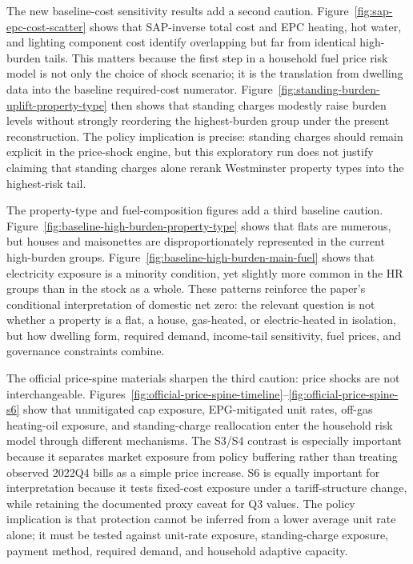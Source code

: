 The new baseline-cost sensitivity results add a second caution. Figure~\ref{fig:sap-epc-cost-scatter} shows that SAP-inverse total cost and EPC heating, hot water, and lighting component cost identify overlapping but far from identical high-burden tails. This matters because the first step in a household fuel price risk model is not only the choice of shock scenario; it is the translation from dwelling data into the baseline required-cost numerator. Figure~\ref{fig:standing-burden-uplift-property-type} then shows that standing charges modestly raise burden levels without strongly reordering the highest-burden group under the present reconstruction. The policy implication is precise: standing charges should remain explicit in the price-shock engine, but this exploratory run does not justify claiming that standing charges alone rerank Westminster property types into the highest-risk tail.

The property-type and fuel-composition figures add a third baseline caution. Figure~\ref{fig:baseline-high-burden-property-type} shows that flats are numerous, but houses and maisonettes are disproportionately represented in the current high-burden groups. Figure~\ref{fig:baseline-high-burden-main-fuel} shows that electricity exposure is a minority condition, yet slightly more common in the HR groups than in the stock as a whole. These patterns reinforce the paper's conditional interpretation of domestic net zero: the relevant question is not whether a property is a flat, a house, gas-heated, or electric-heated in isolation, but how dwelling form, required demand, income-tail sensitivity, fuel prices, and governance constraints combine.

The official price-spine materials sharpen the third caution: price shocks are not interchangeable. Figures~\ref{fig:official-price-spine-timeline}--\ref{fig:official-price-spine-s6} show that unmitigated cap exposure, EPG-mitigated unit rates, off-gas heating-oil exposure, and standing-charge reallocation enter the household risk model through different mechanisms. The S3/S4 contrast is especially important because it separates market exposure from policy buffering rather than treating observed 2022Q4 bills as a simple price increase. S6 is equally important for interpretation because it tests fixed-cost exposure under a tariff-structure change, while retaining the documented proxy caveat for Q3 values. The policy implication is that protection cannot be inferred from a lower average unit rate alone; it must be tested against unit-rate exposure, standing-charge exposure, payment method, required demand, and household adaptive capacity.

